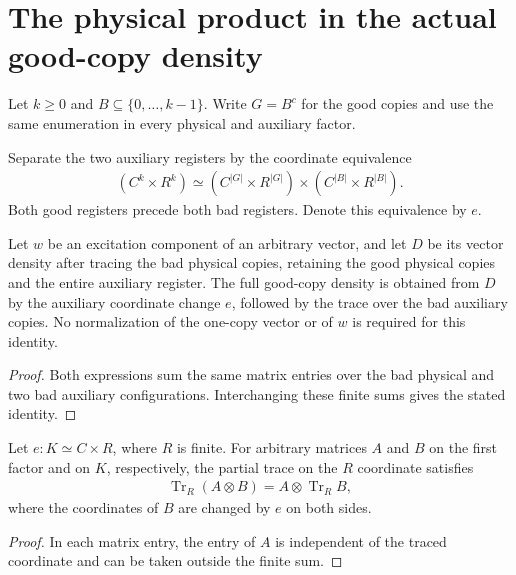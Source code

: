 \section{The physical product in the actual good-copy density}
\label{sec:replica_good_configuration_product}

Let $k\ge0$ and $B\subseteq\{0,\ldots,k-1\}$. Write $G=B^c$ for the good
copies and use the same enumeration in every
physical and auxiliary factor.

\begin{definition}
\label{def:good_auxiliary_split}
\leanok
Separate the two auxiliary registers by the coordinate equivalence
\begin{align*}
 (C^k\times R^k)\simeq
 (C^{|G|}\times R^{|G|})\times(C^{|B|}\times R^{|B|}).
\end{align*}
Both good registers precede both bad registers. Denote this equivalence by $e$.
\end{definition}

\begin{theorem}
\label{thm:replica_good_configuration_successive_traces}
\leanok
{}
Let $w$ be an excitation component of an arbitrary vector, and let $D$ be
its vector density after tracing the bad physical copies, retaining the
good physical copies and the entire auxiliary register. The full good-copy
density is obtained from $D$ by the auxiliary coordinate change $e$,
followed by the trace over the bad auxiliary copies. No normalization of
the one-copy vector or of $w$ is required for this identity.
\end{theorem}
\begin{proof}
\leanok
Both expressions sum the same matrix entries over the bad physical and
two bad auxiliary configurations. Interchanging these finite sums gives
the stated identity.
\end{proof}

\begin{theorem}
\label{thm:partial_trace_along_tensor_factor}
\leanok
Let $e:K\simeq C\times R$, where $R$ is finite. For arbitrary matrices
$A$ and $B$ on the first factor and on $K$, respectively, the partial
trace on the $R$ coordinate satisfies
\begin{align*}
 \operatorname{Tr}_{R}(A\otimes B)
 =A\otimes\operatorname{Tr}_{R}B,
\end{align*}
where the coordinates of $B$ are changed by $e$ on both sides.
\end{theorem}
\begin{proof}
\leanok
In each matrix entry, the entry of $A$ is independent of the traced
coordinate and can be taken outside the finite sum.
\end{proof}



